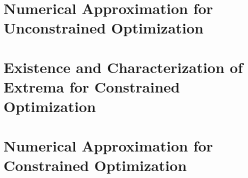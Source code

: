 \documentclass[11pt, reqno]{amsbook}
\begin{document}
\chapter{Numerical Approximation for Unconstrained Optimization}\label{chapter:UnconstrainedNumerical}

% 
% 
% 
% 


\chapter[Constrained Optimization]{Existence and Characterization of Extrema for Constrained Optimization}
\label{chapter:ConstrainedExistenceCharacterization}

% 
% 


\chapter{Numerical Approximation for Constrained Optimization}
\label{chapter:ConstrainedNumerical}





\printindex


\appendix



\end{document}
